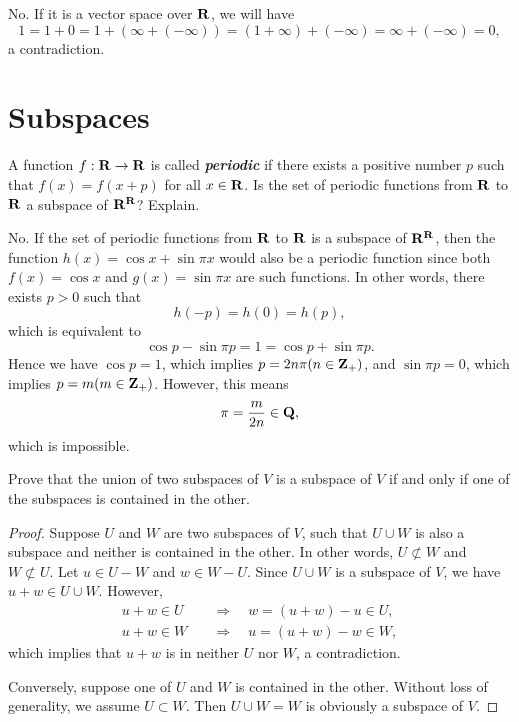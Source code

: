 \begin{solution}
	No. If it is a vector space over \( \mathbf{R} \), we will have
	\[
		1 = 1 + 0 = 1 + (\infty + (-\infty)) = (1 + \infty) + (-\infty) = \infty + (-\infty) = 0,
	\]
	a contradiction.
\end{solution}



\section{Subspaces}

\begin{exercise}{9}
A function \( f: \mathbf{R} \to \mathbf{R} \) is called \textbf{\textit{periodic}} if there exists a positive number \( p \) such that \( f(x) = f(x + p) \) for all \( x \in \mathbf{R} \). Is the set of periodic functions from \( \mathbf{R} \) to \( \mathbf{R} \) a subspace of \( \mathbf{R}^{\mathbf{R}} \)? Explain.
\end{exercise}

\begin{solution}
	No. If the set of periodic functions from \( \mathbf{R} \) to \( \mathbf{R} \) is a subspace of \( \mathbf{R}^{\mathbf{R}} \), then the function \( h(x) = \cos x + \sin\pi x \) would also be a periodic function since both \( f(x) = \cos x \) and \( g(x) = \sin\pi x \) are such functions. In other words, there exists \( p > 0 \) such that
	\[
		h(-p) = h(0) = h(p),
	\]
	which is equivalent to
	\[
		\cos p - \sin\pi p = 1 = \cos p + \sin\pi p.
	\]
	Hence we have \( \cos p = 1 \), which implies \( p = 2n\pi (n \in \mathbf{Z}_{+}) \), and \( \sin\pi p = 0 \), which implies \( p = m (m \in \mathbf{Z}_{+}) \). However, this means
	\[
		\pi = \frac{m}{2n} \in \mathbf{Q},
	\]
	which is impossible.
\end{solution}

\begin{exercise}{12}
	Prove that the union of two subspaces of \( V \) is a subspace of \( V \) if and only if one of the subspaces is contained in the other.
\end{exercise}

\begin{proof}
	Suppose \( U \) and \( W \) are two subspaces of \( V \), such that \( U \cup W \) is also a subspace and neither is contained in the other. In other words, \( U \not\subset W \) and \( W \not\subset U \). Let \( u \in U - W \) and \( w \in W - U \). Since \( U \cup W \) is a subspace of \( V \), we have \( u + w \in U \cup W \). However,
	\begin{align*}
		u + w \in U \quad &\Rightarrow \quad w = (u + w) - u \in U, \\
		u + w \in W \quad &\Rightarrow \quad u = (u + w) - w \in W,
	\end{align*}
	which implies that \( u + w \) is in neither \( U \) nor \( W \), a contradiction.

	Conversely, suppose one of \( U \) and \( W \) is contained in the other. Without loss of generality, we assume \( U \subset W \). Then \( U \cup W = W \) is obviously a subspace of \( V \).
\end{proof}

